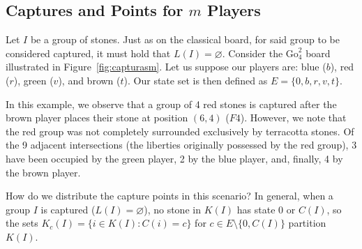 \subsection{Captures and Points for \texorpdfstring{$m$}{m} Players}\label{capturas_n_jug}

Let $I$ be a group of stones. Just as on the classical board, for said group to be
considered captured, it must hold that $L(I)=\varnothing$. Consider the $\mathrm{Go}^{2}_{4}$
board illustrated in Figure~\ref{fig:capturasm}. Let us suppose our players are:
blue ($b$), red ($r$), green ($v$), and brown ($t$). Our state set is then defined
as $E = \{0, b, r, v, t\}$.

In this example, we observe that a group of 4 red stones is captured after the brown
player places their stone at position $(6,4)$ ($F4$). However, we note that the red group was not completely surrounded exclusively by terracotta stones. Of the 9 adjacent intersections (the liberties originally possessed by the red group), 3 have been occupied by the green player, 2 by the blue player, and, finally, 4 by the brown player.

How do we distribute the capture points in this scenario? In general, when a group $I$  is captured ($L(I) = \varnothing$), no stone in $K(I)$ has state $0$ or $C(I)$, so the sets $K_c(I) = \{i \in K(I) : C(i) = c\}$ for $c \in E \setminus \{0, C(I)\}$ partition $K(I)$.

